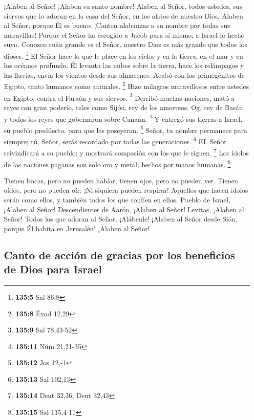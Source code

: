  ¡Alaben al Señor! ¡Alaben su santo nombre! Alaben al Señor,
todos ustedes, sus siervos  que lo adoran en la casa del
Señor, en los atrios de nuestro Dios.  Alaben al Señor,
porque Él es bueno; ¡Canten alabanzas a su nombre por todas sus
maravillas!  Porque el Señor ha escogido a Jacob para sí
mismo; a Israel lo hecho suyo.  Conozco cuán grande es el
Señor, nuestro Dios es más grande que todos los dioses. \footnote{\textbf{135:5}
  Sal 86,8}  El Señor hace lo que le place en los cielos y
en la tierra, en el mar y en los océanos profundo.  Él
levanta las nubes sobre la tierra, hace los relámpagos y las lluvias,
envía los vientos desde sus almacenes.  Acabó con los
primogénitos de Egipto, tanto humanos como animales. \footnote{\textbf{135:8}
  Éxod 12,29}  Hizo milagros maravillosos entre ustedes en
Egipto, contra el Faraón y sus siervos. \footnote{\textbf{135:9} Sal
  78,43-52}  Derribó muchas naciones, mató a reyes con gran
poderío, tales como  Sijón, rey de los amorreos, Og, rey de
Basán, y todos los reyes que gobernaron sobre Canaán. \footnote{\textbf{135:11}
  Núm 21,21-35}  Y entregó sus tierras a Israel, su pueblo
predilecto, para que las poseyeran. \footnote{\textbf{135:12} Jos 12,-1}
 Señor, tu nombre permanece para siempre; tú, Señor, serás
recordado por todas las generaciones. \footnote{\textbf{135:13} Sal
  102,13}  EL Señor reivindicará a su pueblo; y mostrará
compasión con los que le siguen. \footnote{\textbf{135:14} Deut 32,36;
  Deut 32,43}  Los ídolos de las naciones paganas son solo
oro y metal, hechos por manos humanas. \footnote{\textbf{135:15} Sal
  115,4-11}

 Tienen bocas, pero no pueden hablar; tienen ojos, pero no
pueden ver.  Tienen oídos, pero no pueden oír; ¡Ni siquiera
pueden respirar!  Aquellos que hacen ídolos serán como
ellos, y también todos los que confíen en ellos.  Pueblo de
Israel, ¡Alaben al Señor! Descendientes de Aarón, ¡Alaben al Señor!
 Levitas, ¡Alaben al Señor! Todos los que adoran al Señor,
¡Alábenle!  ¡Alaben al Señor desde Sión, porque Él habita
en Jerusalén! ¡Alaben al Señor!

\hypertarget{canto-de-acciuxf3n-de-gracias-por-los-beneficios-de-dios-para-israel}{%
\subsection{Canto de acción de gracias por los beneficios de Dios para
Israel}\label{canto-de-acciuxf3n-de-gracias-por-los-beneficios-de-dios-para-israel}}

